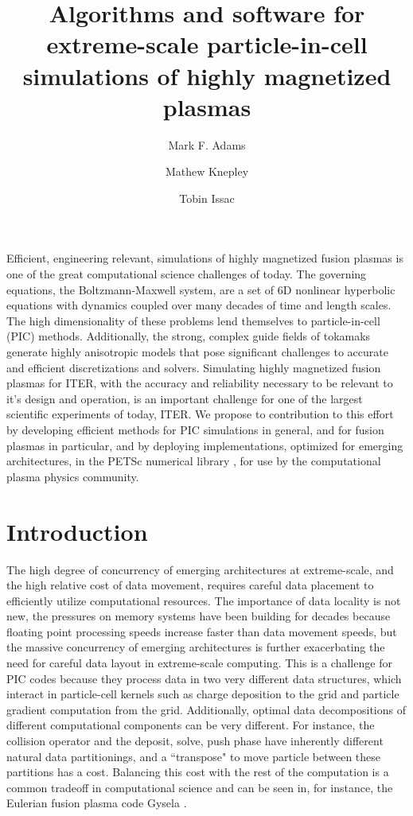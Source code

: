 \documentclass[review]{siamart}
\title{Algorithms and software for extreme-scale particle-in-cell simulations of highly magnetized plasmas}
\author{Mark F. Adams\and Mathew Knepley\and Tobin Issac}
\begin{document}
\maketitle

Efficient, engineering relevant, simulations of highly magnetized fusion plasmas is one of the great computational science challenges of today.
The governing equations, the Boltzmann-Maxwell system, are a set of 6D nonlinear hyperbolic equations with dynamics coupled over many decades of time and length scales.
The high dimensionality of these problems lend themselves to particle-in-cell (PIC) methods.
Additionally, the strong, complex guide fields of tokamaks generate highly anisotropic models that pose significant challenges to accurate and efficient discretizations and solvers.
Simulating highly magnetized fusion plasmas for ITER, with the accuracy and reliability necessary to be relevant to it's design and operation, is an important challenge for one of the largest scientific experiments of today, ITER.
We propose to contribution to this effort by developing efficient methods for PIC simulations in general, and for fusion plasmas in particular, and by deploying implementations, optimized for emerging architectures, in the PETSc numerical library \cite{KnepleyBrownMcInnesSmithRuppAdams2015b}, for use by the computational plasma physics community.

\section{Introduction}

The high degree of concurrency of emerging architectures at extreme-scale, and the high relative cost of data movement, requires careful data placement to efficiently utilize computational resources.
The importance of data locality is not new, the pressures on memory systems have been building for decades because floating point processing speeds increase faster than data movement speeds, but the massive concurrency of emerging architectures is further exacerbating the need for careful data layout in extreme-scale computing.
This is a challenge for PIC codes because they process data in two very different data structures, which interact in particle-cell kernels such as charge deposition to the grid and particle gradient computation from the grid.
Additionally, optimal data decompositions of different computational components can be very different.
For instance, the collision operator and the deposit, solve, push phase have inherently different natural data partitionings, and a ``transpose" to move particle between these partitions has a cost.
Balancing this cost with the rest of the computation is a common tradeoff in computational science and can be seen in, for instance, the Eulerian fusion plasma code Gysela \cite{Bigot13}.
\end{document}
